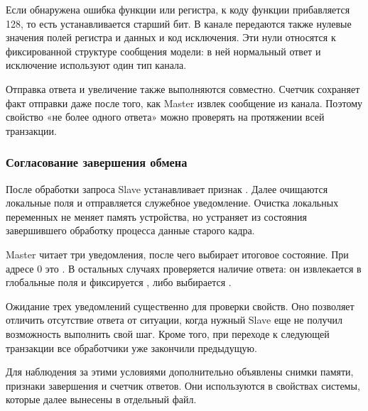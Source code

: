 Если обнаружена ошибка функции или регистра, к коду функции прибавляется
128, то есть устанавливается старший бит. В канале передаются также
нулевые значения полей регистра и данных и код исключения. Эти нули
относятся к фиксированной структуре сообщения модели: в ней нормальный
ответ и исключение используют один тип канала.

Отправка ответа и увеличение  также выполняются
совместно. Счетчик сохраняет факт отправки даже после того, как Master
извлек сообщение из канала. Поэтому свойство «не более одного ответа»
можно проверять на протяжении всей транзакции.

\subsubsection{Согласование завершения обмена}

После обработки запроса Slave устанавливает признак
. Далее очищаются локальные поля и
отправляется служебное уведомление. Очистка локальных переменных не меняет память
устройства, но устраняет из состояния завершившего обработку процесса
данные старого кадра.


Master читает три уведомления, после чего выбирает итоговое состояние.
При адресе 0 это . В остальных случаях
проверяется наличие ответа: он извлекается в глобальные поля и
фиксируется , либо выбирается .


Ожидание трех уведомлений существенно для проверки свойств. Оно позволяет
отличить отсутствие ответа от ситуации, когда нужный Slave еще не получил
возможность выполнить свой шаг. Кроме того, при переходе к следующей
транзакции все обработчики уже закончили предыдущую.

Для наблюдения за этими условиями дополнительно объявлены снимки памяти,
признаки завершения и счетчик ответов. Они используются в свойствах
системы, которые далее вынесены в отдельный файл.

\FloatBarrier
